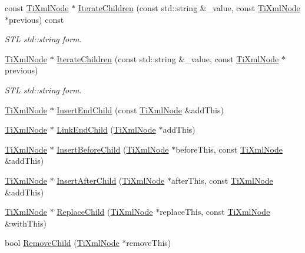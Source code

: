 \begin{DoxyCompactItemize}
\item 
const \hyperlink{class_ti_xml_node}{Ti\+Xml\+Node} $\ast$ \hyperlink{class_ti_xml_node_a412c25b2b7e6709a4b291b13df0632eb}{Iterate\+Children} (const std\+::string \&\+\_\+value, const \hyperlink{class_ti_xml_node}{Ti\+Xml\+Node} $\ast$previous) const
\begin{DoxyCompactList}\small\item\em S\+TL std\+::string form. \end{DoxyCompactList}\item 
\hyperlink{class_ti_xml_node}{Ti\+Xml\+Node} $\ast$ \hyperlink{class_ti_xml_node_a16e9ad53e2f5445b14bf325c90aa862c}{Iterate\+Children} (const std\+::string \&\+\_\+value, const \hyperlink{class_ti_xml_node}{Ti\+Xml\+Node} $\ast$previous)
\begin{DoxyCompactList}\small\item\em S\+TL std\+::string form. \end{DoxyCompactList}\item 
\hyperlink{class_ti_xml_node}{Ti\+Xml\+Node} $\ast$ \hyperlink{class_ti_xml_node_af287a913ce46d8dbf7ef24fec69bbaf0}{Insert\+End\+Child} (const \hyperlink{class_ti_xml_node}{Ti\+Xml\+Node} \&add\+This)
\item 
\hyperlink{class_ti_xml_node}{Ti\+Xml\+Node} $\ast$ \hyperlink{class_ti_xml_node_a1a881212554b759865f6cac79a851d38}{Link\+End\+Child} (\hyperlink{class_ti_xml_node}{Ti\+Xml\+Node} $\ast$add\+This)
\item 
\hyperlink{class_ti_xml_node}{Ti\+Xml\+Node} $\ast$ \hyperlink{class_ti_xml_node_a71e54e393336382bc9875f64aab5cb15}{Insert\+Before\+Child} (\hyperlink{class_ti_xml_node}{Ti\+Xml\+Node} $\ast$before\+This, const \hyperlink{class_ti_xml_node}{Ti\+Xml\+Node} \&add\+This)
\item 
\hyperlink{class_ti_xml_node}{Ti\+Xml\+Node} $\ast$ \hyperlink{class_ti_xml_node_a274db3292218202805c093f66a964cb5}{Insert\+After\+Child} (\hyperlink{class_ti_xml_node}{Ti\+Xml\+Node} $\ast$after\+This, const \hyperlink{class_ti_xml_node}{Ti\+Xml\+Node} \&add\+This)
\item 
\hyperlink{class_ti_xml_node}{Ti\+Xml\+Node} $\ast$ \hyperlink{class_ti_xml_node_a543208c2c801c84a213529541e904b9f}{Replace\+Child} (\hyperlink{class_ti_xml_node}{Ti\+Xml\+Node} $\ast$replace\+This, const \hyperlink{class_ti_xml_node}{Ti\+Xml\+Node} \&with\+This)
\item 
bool \hyperlink{class_ti_xml_node_ae19d8510efc90596552f4feeac9a8fbf}{Remove\+Child} (\hyperlink{class_ti_xml_node}{Ti\+Xml\+Node} $\ast$remove\+This)

\end{DoxyCompactItemize}
